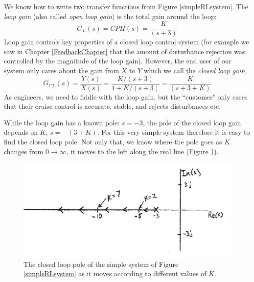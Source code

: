 We know how to write two transfer functions from Figure \ref{simpleRLsystem}.   The {\it loop gain} (also called {\it open loop gain}) is the total gain around the loop:
\[
G_L(s) = CPH(s) = \frac{K}{(s+3)}
\]
Loop gain controls key properties of a closed loop control system (for example we saw in Chapter \ref{FeedbackChapter}
that the amount of disturbance rejection was controlled by the magnitude of the loop gain).  
However, the end user of our system only cares about the gain from $X$ to $Y$ which we  call 
the {\it closed loop gain},
\[
G_{CL}(s) = \frac{Y(s)}{X(s)} = \frac {K/(s+3)} {1+K/(s+3)} = \frac {K} {(s+3+K)}
\]
As engineers, we need to fiddle with the loop gain, but the ``customer" only cares that their cruise control is accurate, stable, and rejects disturbances etc.

While the loop gain has a known pole: $s=-3$, the pole of the closed loop gain depends on $K$, $s=-(3+K)$.   For this very simple system therefore it is easy to find the closed loop pole.   Not only that, we know where the pole goes as $K$ changes from $0\to\infty$, it moves to the left along the real line (Figure \ref{movingsimplepole}).

\begin{figure}\centering
\includegraphics[width=120mm]{figs07/00971.png}
\caption{The closed loop pole of the simple system of Figure \ref{simpleRLsystem} as it moves according to different values of $K$.}\label{movingsimplepole}
\end{figure}




